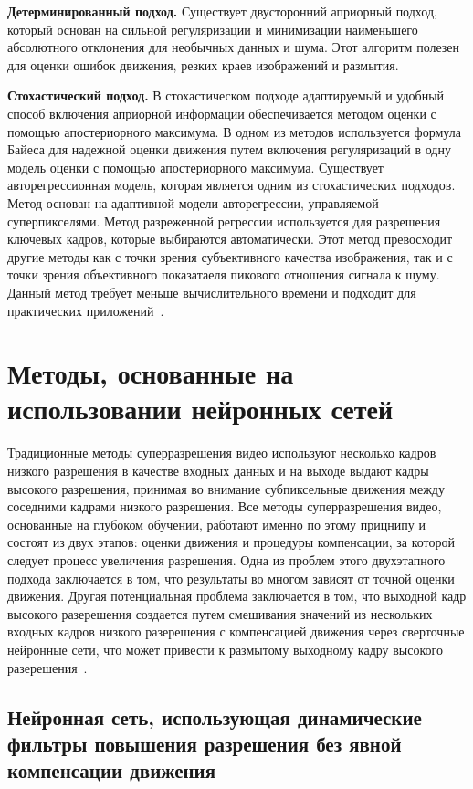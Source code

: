 \documentclass{bmstu}
\begin{document}
\textbf{Детерминированный подход.} 
Существует двусторонний априорный подход, который основан на сильной регуляризации и минимизации наименьшего абсолютного отклонения для необычных данных и шума. 
Этот алгоритм полезен для оценки ошибок движения, резких краев изображений и размытия. 

\textbf{Стохастический подход.} 
В стохастическом подходе адаптируемый и удобный способ включения априорной информации обеспечивается методом оценки с помощью апостериорного максимума. 
В одном из методов используется формула Байеса для надежной оценки движения путем включения регуляризаций в одну модель оценки с помощью апостериорного максимума. 
Существует авторегрессионная модель, которая является одним из стохастических подходов. 
Метод основан на адаптивной модели авторегрессии, управляемой суперпикселями. 
Метод разреженной регрессии используется для разрешения ключевых кадров, которые выбираются автоматически. 
Этот метод превосходит другие методы как с точки зрения субъективного качества изображения, так и с точки зрения объективного показатаеля пикового отношения сигнала к шуму. 
Данный метод требует меньше вычислительного времени и подходит для практических приложений~\cite{Daithankar2021}.

\section{Методы, основанные на использовании нейронных сетей}

Традиционные методы суперразрешения видео используют несколько кадров низкого разрешения в качестве входных данных и на выходе выдают кадры высокого разрешения, принимая во внимание субпиксельные движения между соседними кадрами низкого разрешения. 
Все методы суперразрешения видео, основанные на глубоком обучении, работают именно по этому прицнипу и состоят из двух этапов: оценки движения и процедуры компенсации, за которой следует процесс увеличения разрешения. 
Одна из проблем этого двухэтапного подхода заключается в том, что результаты во многом зависят от точной оценки движения. 
Другая потенциальная проблема заключается в том, что выходной кадр высокого разерешения создается путем смешивания значений из нескольких входных кадров низкого разерешения с компенсацией движения через сверточные нейронные сети, что может привести к размытому выходному кадру высокого разерешения~\cite{Younghyun2018}.

\subsection{Нейронная сеть, использующая динамические фильтры повышения разрешения без явной компенсации движения}
\end{document}
